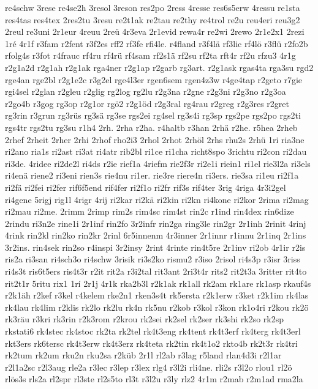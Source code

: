 {re4schw
3rese
re4se2h
3resol
3reson
res2po
2ress
4resse
res6s5erw
4ressu
re1sta
res4tas
res4tex
2res2tu
3resu
re2t1ak
re2tau
re2thy
re4trol
re2u
reu4eri
reu3g2
2reul
re3uni
2r1eur
4reuu
2reü
4r3eva
2r1evid
rewa4r
re2wi
2rewo
2r1e2x1
2rezi
1ré
4r1f
r3fam
r2fent
r3f2es
rff2
rf3fe
rfi4le.
r4fland
r3f4lä
rf3lic
rf4lö
r3flü
r2fo2b
rfolg4s
r3fot
r4frauc
rf4ru
rf4rü
rf4sam
rf2s1ä
rf2su
rf2ta
rft4r
rf2u
rfzu3
4r1g
r2g1a2d
r2g1ah
r2g1ak
rga4ner
r2g1ap
r2garb
rg3art.
r2g1ask
rgas4ta
rga3su
rgd2
rge4an
rge2bl
r2g1e2c
r3g2el
rge4l3er
rgen6sem
rgen4z3w
r4ge4tap
r2geto
r7gie
rgi4sel
r2glan
r2gleu
r2glig
rg2log
rg2lu
r2g3na
r2gne
r2g3ni
r2g3no
r2g3oa
r2go4b
r3gog
rg3op
r2g1or
rgö2
r2g1öd
r2g3ral
rg4rau
r2greg
r2g3res
r2gret
rg3rin
r3grun
rg3rüs
rg3sä
rg3se
rgs2ei
rg4sel
rg3s4i
rg3sp
rgs2pe
rgs2po
rgs2ti
rgs4tr
rgs2tu
rg3su
r1h4
2rh.
2rha
r2ha.
r4haltb
r3han
2rhä
r2he.
r5hea
2rheb
2rhef
2rheit
2rher
2rhi
2rhof
rho2i3
2rhol
2rhot
2rhöl
2rhs
rhu2s
2rhü
1ri
ria3ne
ri2ano
ria1s
ri2ast
ri3at
ri4atr
rib2bl
ri1ce
ri1cha
richt8spo
3richtu
ri2con
ri2dau
ri3de.
4ridee
ri2de2l
ri4ds
r2ie
rief1a
4riefm
rie2f3r
ri2e1i
riein1
ri1el
rie3l2a
ri3els
ri4enä
riene2
ri3eni
rien3s
rie4nu
ri1er.
rie3re
riere4n
ri3ers.
rie3sa
ri1eu
ri2f1a
ri2fä
ri2fei
ri2fer
rif6f5end
rif4fer
ri2f1o
ri2fr
rif3s
rif4ter
3rig
4riga
4r3i2gel
ri4gene
5rigj
rig1l
4rigr
4rij
ri2kar
ri2kä
ri2kin
ri2kn
ri4kone
ri2kor
2rima
ri2mag
ri2mau
ri2me.
2rimm
2rimp
rim2s
rim4sc
rim4st
rin2c
r1ind
rin4dex
rin6dize
2rindu
ri3n2e
rine1i
2r1inf
rin2fo
3r2infr
rin2ga
ring3le
rin2gr
2r1inh
2rinit
4rinj
4rink
rin2kl
rin2ko
rin2kr
2rinl
6r5innenm
4r3inner
2r1innr
r1innu
2r1inq
2r1ins
3r2ins.
rin4sek
rin2so
r4inspi
3r2insy
2rint
4rinte
rin4t5re
2r1inv
ri2ob
4r1ir
r2is
ris2a
ri3san
ri4sch3o
ri4schw
3risik
ri3s2ko
rismu2
r3iso
2risol
ri4s3p
r3isr
3riss
ri4s3t
ris6t5ers
ris4t3r
r2it
rit2a
r3i2tal
rit3ant
2ri3t4r
rits2
rit2t3a
3ritter
rit4to
rit2t1r
5ritu
rix1
1rí
2r1j
4r1k
rka2b3l
r2k1ak
rk1all
rk2am
rk1are
rk1asp
rkauf4s
r2k1äh
r2kef
r3kel
r4kelem
rke2n1
rken3s4t
rk5ersta
r2k1erw
r3ket
r2k1im
rk4las
rk4lau
rk4lim
r2klis
rk2lo
rk2lu
rk4n
rk5nu
r2kob
r3kol
r3kon
rk1o4ri
r2kou
rk2ö
rk3räu
r3kri
rk3rin
r2k3rom
r2krou
rk2sei
rk2sel
rk2ser
rk3shi
rk2so
rk2sp
rkstati6
rk4stec
rk4stoc
rk2ta
rk2tel
rk4t3eng
rk4tent
rk4t3erf
rk4terg
rk4t3erl
rkt3ers
rk6tersc
rk4t3erw
rk4t3erz
rk4teta
rk2tin
rk4t1o2
rkto4b
rk2t3r
rk4tri
rk2tum
rk2um
rku2n
rku2sa
r2küb
2r1l
rl2ab
r3lag
r5land
rlan4d3i
r2l1ar
r2l1a2sc
r2l3aug
rle2a
r3lec
r3lep
r3lex
rlg4
r3l2i
rli4ne.
rli2s
r3l2o
rlou1
rl2ö
rlös3s
rls2a
rl2spr
rl3ste
rl2s5to
rl3t
r3l2u
r3ly
rlz2
4r1m
r2mab
r2m1ad
rma2la
}
